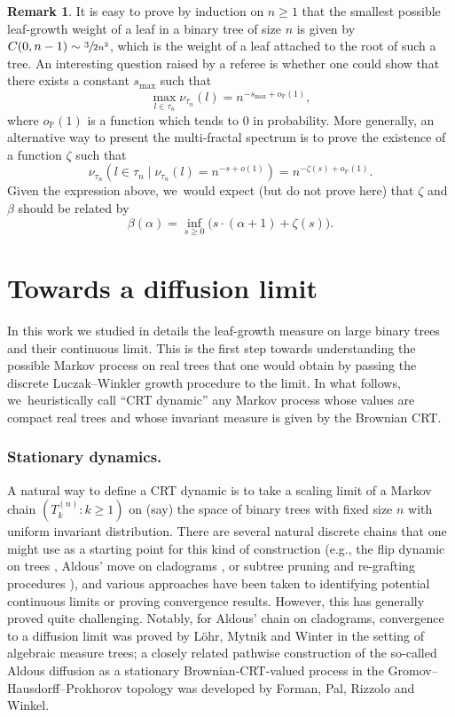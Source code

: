 \documentclass[11pt]{article}
\theoremstyle{definition}
\newtheorem{rem}[thm]{Remark}
\begin{document}
\begin{rem}\label{rem:multi-fractal}It is easy to prove by induction on $n \geq 1$ that the smallest possible leaf-growth weight of a leaf in a binary tree of size $n$ is given by $C(0,n-1) \sim \sfrac{3}{2 n^2}$, which is the weight of a leaf attached to the root of such a tree. An interesting question raised by a referee is whether one could show that there exists a constant $s_{\max}$ such that
\[
\max_{l \in \tau_n} \nu_{\tau_n}(l) = n^{-s_{\max} + o_{\mathbb{P}}(1)},
\]
where $o_{\mathbb{P}}(1)$ is a function which tends to $0$ in probability. More generally, an alternative way to present the multi-fractal spectrum is to prove the existence of a function $\zeta$ such that
\[
\nu_{\tau_n}(l \in \tau_n \mid \nu_{\tau_n}(l) = n^{-s+o(1)}) = n^{-\zeta(s)+o_{\mathbb{P}}(1)}.
\]
Given the expression above, we~would expect (but do not prove here) that $\zeta$ and $\beta$ should be related by
\[
\beta(\alpha) = \inf_{s \geq 0} \big(s\cdot (\alpha+1) + \zeta(s)\big).
\]
\end{rem}

\section{Towards a diffusion limit}
In this work we studied in details the leaf-growth measure on large binary trees and their continuous limit. This is the first step towards understanding the possible Markov process on real trees that one would obtain by passing the discrete Luczak--Winkler growth procedure to the limit. In what follows, we~heuristically call ``CRT dynamic'' any Markov process whose values are compact real trees and whose invariant measure is given by the Brownian CRT.

\subsubsection*{Stationary dynamics.} A natural way to define a CRT dynamic is to take a scaling limit of a Markov chain $(T^{(n)}_k : k \geq 1)$ on (say) the space of binary trees with fixed size $n$ with uniform invariant distribution. There are several natural discrete chains that one might use as a starting point for this kind of construction (e.g., the flip dynamic on trees \cite{mcshine1997mixing}, Aldous' move on cladograms \cite{lohr2020aldous,forman2023aldous}, or subtree pruning and re-grafting procedures \cite{EW06}), and various approaches have been taken to identifying potential continuous limits or proving convergence results. However, this has generally proved quite challenging. Notably, for Aldous' chain on cladograms, convergence to a diffusion limit was proved by Löhr, Mytnik and Winter in the setting of algebraic measure trees; a closely related pathwise construction of the so-called Aldous diffusion as a stationary Brownian-CRT-valued process in the Gromov–Hausdorff–Prokhorov topology was developed by Forman, Pal, Rizzolo and Winkel.
\end{document}
